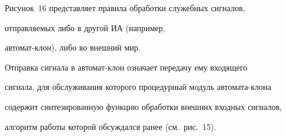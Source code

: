       Рисунок~16 представляет правила обработки служебных сигналов, 


отправляемых либо в другой ИА (например, 


      ав\-то\-мат-клон), либо во внешний мир.


      


      Отправка сигнала в автомат-клон означает передачу ему входящего 


сигнала, для обслуживания которого процедурный модуль ав\-то\-ма\-та-кло\-на 


содержит синтезированную функцию обработки внешних входных сигналов, 


алгоритм работы которой обсуждался ранее (см.\ рис.~15).


      


